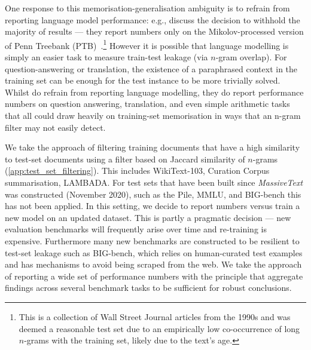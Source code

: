 \documentclass[11pt, a4paper, logo, internal, copyright, nonumbering]{deepmind}
\newcommand{\massivetext}{\textit{MassiveText}\xspace}
\newcommand{\bigbench}{BIG-bench\xspace}
\begin{document}
One response to this memorisation-generalisation ambiguity is to refrain from reporting language model performance: e.g., \citet{gpt3} discuss the decision to withhold the majority of results --- they report numbers only on the Mikolov-processed version of Penn Treebank (PTB)~\citep{ptb, mikolov2011empirical}.\footnote{This is a collection of Wall Street Journal articles from the 1990s and was deemed a reasonable test set due to an empirically low co-occurrence of long $n$-grams with the training set, likely due to the text's age.} However it is possible that language modelling is simply an easier task to measure train-test leakage (via $n$-gram overlap). For question-answering or translation, the existence of a paraphrased context in the training set can be enough for the test instance to be more trivially solved. Whilst \citet{gpt3} do refrain from reporting language modelling, they do report performance numbers on question answering, translation, and even simple arithmetic tasks that all could draw heavily on training-set memorisation in ways that an n-gram filter may not easily detect. 

We take the approach of filtering training documents that have a high similarity to test-set documents using a filter based on Jaccard similarity of $n$-grams (\autoref{app:test_set_filtering}). This includes WikiText-103, Curation Corpus summarisation, LAMBADA.  For test sets that have been built since \massivetext was constructed (November 2020), such as the Pile, MMLU, and \bigbench this has not been applied. In this setting, we decide to report numbers versus train a new model on an updated dataset. This is partly a pragmatic decision --- new evaluation benchmarks will frequently arise over time and re-training is expensive. Furthermore many new benchmarks are constructed to be resilient to test-set leakage such as \bigbench, which relies on human-curated test examples and has mechanisms to avoid being scraped from the web. We take the approach of reporting a wide set of performance numbers with the principle that aggregate findings across several benchmark tasks to be sufficient for robust conclusions. 
\end{document}
